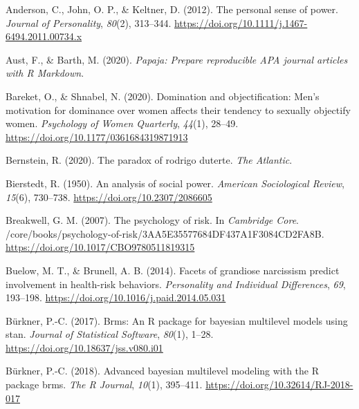 \documentclass[
  donotrepeattitle,doc, 12pt, a4paper,floatsintext]{apa7}
\newlength{\cslhangindent}
\newlength{\cslentryspacingunit} %
\newenvironment{CSLReferences}[2] %
 {%
  \setlength{\parindent}{0pt}
  \ifodd #1
  \let\oldpar\par
  \def\par{\hangindent=\cslhangindent\oldpar}
  \fi
  \setlength{\parskip}{#2\cslentryspacingunit}
 }%
 {}
\begin{document}
\begingroup

\hypertarget{refs}{}
\begin{CSLReferences}{1}{0}
\leavevmode{}%
Anderson, C., John, O. P., \& Keltner, D. (2012). The personal sense of power. \emph{Journal of Personality}, \emph{80}(2), 313--344. \url{https://doi.org/10.1111/j.1467-6494.2011.00734.x}

\leavevmode{}%
Aust, F., \& Barth, M. (2020). \emph{Papaja: {Prepare} reproducible {APA} journal articles with {R Markdown}}.

\leavevmode{}%
Bareket, O., \& Shnabel, N. (2020). Domination and objectification: Men's motivation for dominance over women affects their tendency to sexually objectify women. \emph{Psychology of Women Quarterly}, \emph{44}(1), 28--49. \url{https://doi.org/10.1177/0361684319871913}

\leavevmode{}%
Bernstein, R. (2020). The paradox of rodrigo duterte. \emph{The Atlantic}.

\leavevmode{}%
Bierstedt, R. (1950). An analysis of social power. \emph{American Sociological Review}, \emph{15}(6), 730--738. \url{https://doi.org/10.2307/2086605}

\leavevmode{}%
Breakwell, G. M. (2007). The psychology of risk. In \emph{Cambridge Core}. /core/books/psychology-of-risk/3AA5E35577684DF437A1F3084CD2FA8B. \url{https://doi.org/10.1017/CBO9780511819315}

\leavevmode{}%
Buelow, M. T., \& Brunell, A. B. (2014). Facets of grandiose narcissism predict involvement in health-risk behaviors. \emph{Personality and Individual Differences}, \emph{69}, 193--198. \url{https://doi.org/10.1016/j.paid.2014.05.031}

\leavevmode{}%
Bürkner, P.-C. (2017). Brms: An {R} package for bayesian multilevel models using stan. \emph{Journal of Statistical Software}, \emph{80}(1), 1--28. \url{https://doi.org/10.18637/jss.v080.i01}

\leavevmode{}%
Bürkner, P.-C. (2018). Advanced bayesian multilevel modeling with the {R} package brms. \emph{The R Journal}, \emph{10}(1), 395--411. \url{https://doi.org/10.32614/RJ-2018-017}


\end{CSLReferences}
\end{document}
